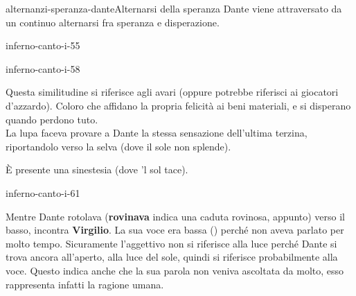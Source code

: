\documentclass[preview]{standalone}
\begin{document}
\begin{snippetnote}{alternanzi-speranza-dante}{Alternarsi della speranza}
    Dante viene attraversato da un continuo alternarsi fra speranza e disperazione.
\end{snippetnote}

\begin{snippet}{inferno-canto-i-55}

\end{snippet}

\begin{snippet}{inferno-canto-i-58}

    Questa similitudine si riferisce agli avari (oppure potrebbe riferisci ai giocatori d'azzardo).
    Coloro che affidano la propria felicità ai beni materiali, e si disperano quando perdono tuto.
    \\
    La lupa faceva provare a Dante la stessa sensazione dell'ultima terzina,
    riportandolo verso la selva (dove il sole non splende).
    
    È presente una sinestesia (dove 'l sol tace).
\end{snippet}

\begin{snippet}{inferno-canto-i-61}

    Mentre Dante rotolava (\textbf{rovinava} indica una caduta rovinosa, appunto) verso il basso, incontra \textbf{Virgilio}.
    La sua voce era bassa () perché non aveva parlato per molto tempo. Sicuramente l'aggettivo  non si 
    riferisce alla luce perché Dante si trova ancora all'aperto, alla luce del sole, quindi si riferisce probabilmente alla voce.
    Questo indica anche che la sua parola non veniva ascoltata da molto,
    esso rappresenta infatti la ragione umana.
\end{snippet}
\end{document}
